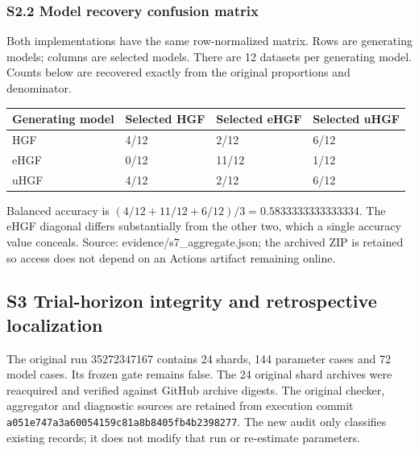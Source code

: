 \documentclass[
  11pt,
]{article}
\newcounter{none} %
\begin{document}
\subsubsection{S2.2 Model recovery confusion
matrix}\label{s2.2-model-recovery-confusion-matrix}

Both implementations have the same row-normalized matrix. Rows are
generating models; columns are selected models. There are 12 datasets
per generating model. Counts below are recovered exactly from the
original proportions and denominator.

{\def\LTcaptype{none} %
\begin{minipage}{\linewidth}
\begin{tabular}{@{}llll@{}}
\toprule\noalign{}
Generating model & Selected HGF & Selected eHGF & Selected uHGF \\
\midrule\noalign{}


HGF & 4/12 & 2/12 & 6/12 \\
eHGF & 0/12 & 11/12 & 1/12 \\
uHGF & 4/12 & 2/12 & 6/12 \\
\bottomrule
\end{tabular}
\end{minipage}

}

Balanced accuracy is \((4/12+11/12+6/12)/3=0.5833333333333334\). The
eHGF diagonal differs substantially from the other two, which a single
accuracy value conceals. Source: evidence/s7\_aggregate.json; the
archived ZIP is retained so access does not depend on an Actions
artifact remaining online.

\subsection{S3 Trial-horizon integrity and retrospective
localization}\label{s3-trial-horizon-integrity-and-retrospective-localization}

The original run 35272347167 contains 24 shards, 144 parameter cases and
72 model cases. Its frozen gate remains false. The 24 original shard
archives were reacquired and verified against GitHub archive digests.
The original checker, aggregator and diagnostic sources are retained
from execution commit \texttt{a051e747a3a60054159c81a8b8405fb4b2398277}.
The new audit only classifies existing records; it does not modify that
run or re-estimate parameters.
\end{document}
